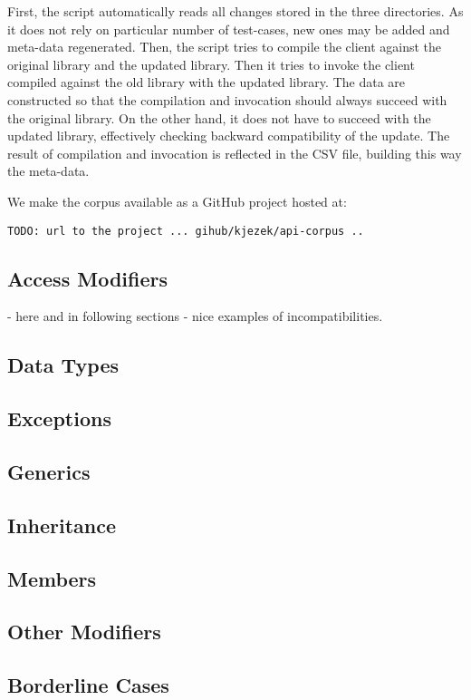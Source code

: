\documentclass[conference]{IEEEtran}
\begin{document}
First, the script automatically reads all changes stored in the three directories. As it does not rely on particular number of test-cases, new ones may be added and meta-data regenerated. Then, the script tries to compile the client against the original library and the updated library. Then it tries to invoke the client compiled against the old library with the updated library. The data are constructed so that the compilation and invocation should always succeed with the original library. On the other hand, it does not have to succeed with the updated library, effectively checking backward compatibility of the update. The result of compilation and invocation is reflected in the CSV file, building this way the meta-data.


We make the corpus available as a GitHub project hosted at: 
\begin{verbatim}
TODO: url to the project ... gihub/kjezek/api-corpus ..
\end{verbatim}


\subsection{Access Modifiers}
- here and in following sections - nice examples of incompatibilities.
\subsection{Data Types}
\subsection{Exceptions}
\subsection{Generics}
\subsection{Inheritance}
\subsection{Members}
\subsection{Other Modifiers}
\subsection{Borderline Cases}
\end{document}
